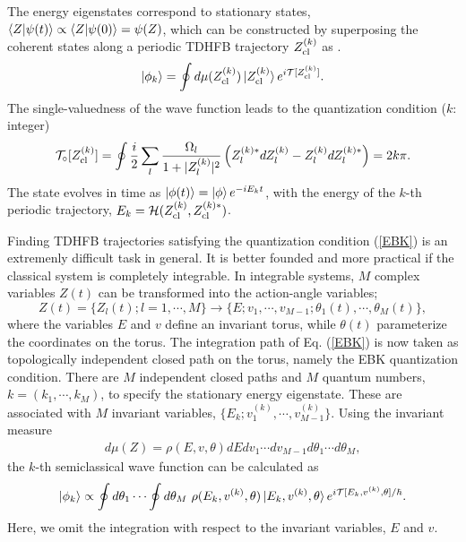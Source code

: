 \documentclass[%
superscriptaddress,
preprint,
showpacs,
nofootinbib,
amsmath,amssymb,
prc,
floatfix ]%
{revtex4-1}
\begin{document}
The energy eigenstates correspond to stationary states,
$\braket{Z|\psi(t)} \propto \braket{Z|\psi(0)}=\psi(Z)$,
which can be constructed by superposing the coherent states along
a periodic TDHFB trajectory $Z_{\rm cl}^{(k)}$ as \cite{path,path2,SM88}.
\begin{equation}
	\ket{\phi_k} = \oint d\mu(Z_{\rm cl}^{(k)}) \ket{Z_{\rm cl}^{(k)}}
	e^{i\mathcal{T}[Z_{\rm cl}^{(k)}]} .
\end{equation}
The single-valuedness of the wave function leads to
the quantization condition ($k$: integer)
\begin{equation}
	\mathcal{T}_\circ[Z_{\rm cl}^{(k)}]=
	\oint \frac{i}{2} \sum_l \frac{\Omega_l}{1+|Z_l^{(k)}|^2}
	\left(Z_l^{(k)*} dZ_l^{(k)} - Z_l^{(k)} dZ_l^{(k)*}\right) = 2k\pi .
	\label{EBK}
\end{equation}
The state evolves in time as $\ket{\phi(t)}=\ket{\phi}e^{-iE_k t}$,
with the energy of the $k$-th periodic trajectory,
$E_k=\mathcal{H}(Z_{\rm cl}^{(k)},Z_{\rm cl}^{(k)*})$.

Finding TDHFB trajectories satisfying the quantization condition
(\ref{EBK}) is an extremenly difficult task in general.
It is better founded and more practical
if the classical system is completely integrable.
In integrable systems, $M$ complex variables $Z(t)$ can be transformed into
the action-angle variables;
\begin{equation}
	Z(t) = \{Z_l(t);l=1,\cdots,M \} \rightarrow
	\{E; v_1,\cdots,v_{M-1}; \theta_1(t),\cdots,\theta_M(t)\} ,
\end{equation}
where the variables $E$ and $v$ define an invariant torus,
while $\theta(t)$ parameterize the coordinates on the torus.
The integration path of Eq. (\ref{EBK}) is now taken as topologically
independent closed path on the torus,
namely the EBK quantization condition.
There are $M$ independent closed paths and $M$ quantum numbers,
$k=(k_1,\cdots,k_M)$, to specify the stationary energy eigenstate.
These are associated with $M$ invariant variables,
$\{E_k;v_1^{(k)},\cdots,v_{M-1}^{(k)}\}$.
Using the invariant measure
\begin{align}
  d\mu(Z) = \rho(E,v,\theta) dEdv_1\cdots dv_{M-1}d\theta_1\cdots d\theta_M,
\end{align}
the $k$-th semiclassical wave function can be calculated as
\begin{equation}
  \ket{\phi_k} \propto \oint d\theta_1\cdots \oint d\theta_M \ 
	\rho(E_k,v^{(k)},\theta)
	\ket{E_k,v^{(k)},\theta} e^{i\mathcal{T}[E_k,v^{(k)},\theta]/\hbar} .
  \label{semi_wave_func}
\end{equation}
Here, we omit the integration with respect to the invariant variables,
$E$ and $v$.
\end{document}
